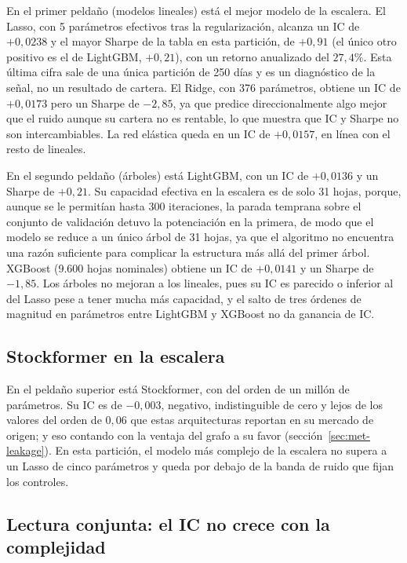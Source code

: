 En el primer peldaño (modelos lineales) está el mejor modelo de la escalera. El Lasso, con
5 parámetros efectivos tras la regularización, alcanza un IC de $+0{,}0238$ y el mayor
Sharpe de la tabla en esta partición, de $+0{,}91$ (el único otro positivo es el de
LightGBM, $+0{,}21$), con un retorno anualizado del $27{,}4\%$. Esta última cifra sale de
una única partición de 250 días y es un diagnóstico de la señal, no un resultado de
cartera. El Ridge, con 376 parámetros, obtiene un IC de $+0{,}0173$ pero
un Sharpe de $-2{,}85$, ya que predice direccionalmente algo mejor que el ruido aunque su cartera
no es rentable, lo que muestra que IC y Sharpe no son intercambiables. La red elástica
queda en un IC de $+0{,}0157$, en línea con el resto de lineales.

En el segundo peldaño (árboles) está LightGBM, con un IC de $+0{,}0136$ y un Sharpe de
$+0{,}21$. Su capacidad efectiva en la escalera es de solo 31 hojas, porque, aunque se le
permitían hasta 300 iteraciones, la parada temprana sobre el conjunto de validación
detuvo la potenciación en la primera, de modo que el modelo se reduce a un único árbol de
31 hojas, ya que el algoritmo no encuentra una razón suficiente para complicar la estructura más allá del primer árbol.
XGBoost (9.600 hojas nominales) obtiene un IC de $+0{,}0141$ y un Sharpe de $-1{,}85$. Los
árboles no mejoran a los lineales, pues su IC es parecido o inferior al del Lasso pese a tener
mucha más capacidad, y el salto de tres órdenes de magnitud en parámetros entre LightGBM y
XGBoost no da ganancia de IC.

\subsection{Stockformer en la escalera}\label{sec:p1-stockformer}

En el peldaño superior está Stockformer, con del orden de un millón de parámetros. Su IC
es de $-0{,}003$, negativo, indistinguible de cero y lejos de los valores del orden de
$0{,}06$ que estas arquitecturas reportan en su mercado de origen; y eso contando con la
ventaja del grafo a su favor (sección~\ref{sec:met-leakage}). En esta partición, el
modelo más complejo de la escalera no supera a un Lasso de cinco parámetros y queda por
debajo de la banda de ruido que fijan los controles.

\subsection{Lectura conjunta: el IC no crece con la complejidad}\label{sec:p1-lectura}

